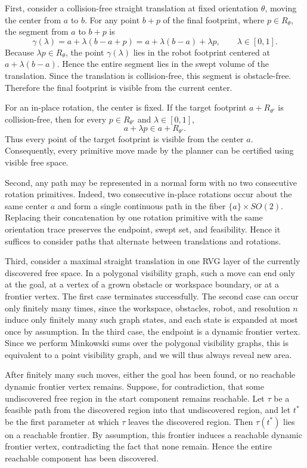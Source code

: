 \documentclass[letterpaper,11pt]{article}
\begin{document}
First, consider a collision-free straight translation at fixed orientation
$\theta$, moving the center from $a$ to $b$. For any point $b+p$ of the
final footprint, where $p\in R_\theta$, the segment from $a$ to $b+p$ is
\[
    \gamma(\lambda)
    = a+\lambda(b-a+p)
    = a+\lambda(b-a)+\lambda p,
    \qquad \lambda\in[0,1].
\]
Because $\lambda p\in R_\theta$, the point $\gamma(\lambda)$ lies in the
robot footprint centered at $a+\lambda(b-a)$. Hence the entire segment lies in
the swept volume of the translation. Since the translation is collision-free,
this segment is obstacle-free. Therefore the final footprint is visible from
the current center.

For an in-place rotation, the center is fixed. If the target footprint
$a+R_{\theta'}$ is collision-free, then for every $p\in R_{\theta'}$ and
$\lambda\in[0,1]$,
\[
    a+\lambda p \in a+R_{\theta'} .
\]
Thus every point of the target footprint is visible from the center $a$.
Consequently, every primitive move made by the planner can be certified using
visible free space.

Second, any path may be represented in a normal form with no two consecutive
rotation primitives. Indeed, two consecutive in-place rotations occur about the
same center $a$ and form a single continuous path in the fiber
$\{a\}\times SO(2)$. Replacing their concatenation by one rotation primitive
with the same orientation trace preserves the endpoint, swept set, and
feasibility. Hence it suffices to consider paths that alternate between
translations and rotations.

Third, consider a maximal straight translation in one RVG layer of the currently
discovered free space. In a polygonal visibility graph, such a move can end only
at the goal, at a vertex of a grown obstacle or workspace boundary, or at a
frontier vertex. The first case terminates successfully. The second case can
occur only finitely many times, since the workspace, obstacles, robot, and
resolution $n$ induce only finitely many such graph states, and each state is
expanded at most once by assumption. In the third case, the endpoint is a
dynamic frontier vertex. Since we perform Minkowski sums over the polygonal
visibility graphs, this is equivalent to a point visibility graph, and we will
thus always reveal new area.

After finitely many such moves, either the goal has been found, or no reachable
dynamic frontier vertex remains. Suppose, for contradiction, that some
undiscovered free region in the start component remains reachable. Let
$\tau$ be a feasible path from the discovered region into that undiscovered
region, and let $t^\ast$ be the first parameter at which $\tau$ leaves the
discovered region. Then $\tau(t^\ast)$ lies on a reachable frontier. By
assumption, this frontier induces a reachable dynamic frontier vertex,
contradicting the fact that none remain. Hence the entire reachable component
has been discovered.
\end{document}
